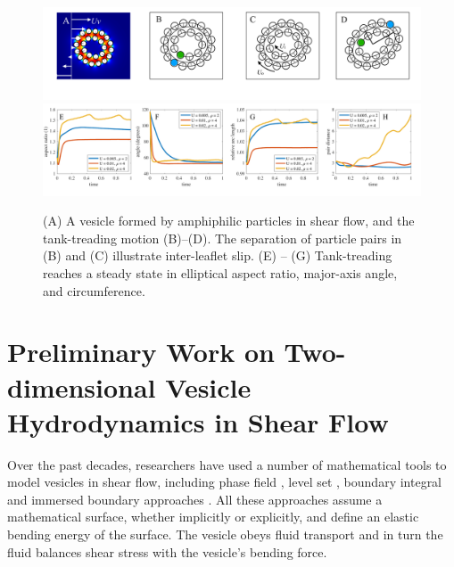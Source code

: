 \begin{figure}[!]
\begin{center}
\includegraphics[width=1\textwidth]{figures/PW_fig1A-D.pdf}
\includegraphics[width=1\textwidth]{figures/PW_fig1E-H.pdf}
\end{center}\vspace{-0.3in}
\caption{ 
(A) A vesicle formed by amphiphilic particles in shear flow,
and the tank-treading motion (B)--(D). The separation of particle
pairs in (B) and (C) illustrate inter-leaflet slip.
(E) -- (G) Tank-treading reaches a steady state in elliptical aspect ratio,
major-axis angle, and circumference. }
\label{fig:tanktreading}
\end{figure}
\section{Preliminary Work on Two-dimensional Vesicle Hydrodynamics in Shear Flow} 
%
Over the past decades, researchers have used a number of mathematical tools 
to model vesicles in shear flow, including  phase field \cite{DuLiuWang2004_JCP,BibenKassnerMisbah2005_PRE}, 
level set \cite{DoyeuxGuyotChabannesEtAl2013_JCAM}, boundary integral \cite{Shravan09,Rahimian15} and 
immersed boundary approaches \cite{KimLai2010_JCP,KimLai2012_PRE,HuLaiSeolEtAl2016_JCP}. All these approaches
assume a mathematical surface, whether implicitly or explicitly, 
and define an elastic bending energy of the surface. The vesicle obeys fluid
transport and in turn the fluid balances shear stress with the vesicle's bending force. 

